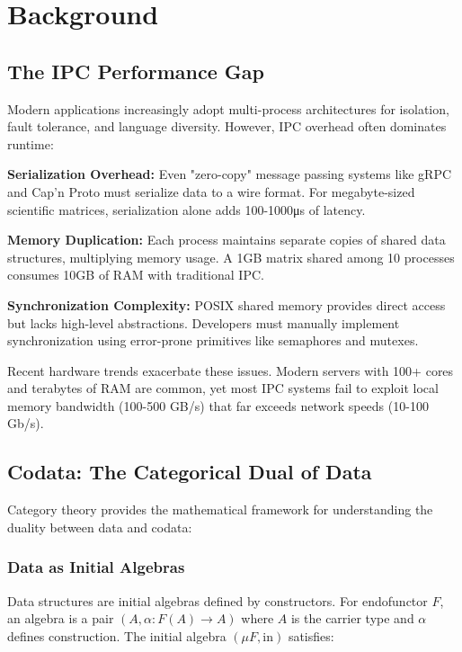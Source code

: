 \documentclass[11pt]{article}
\begin{document}
\section{Background}

\subsection{The IPC Performance Gap}

Modern applications increasingly adopt multi-process architectures for isolation, fault tolerance, and language diversity. However, IPC overhead often dominates runtime:

\textbf{Serialization Overhead:} Even "zero-copy" message passing systems like gRPC and Cap'n Proto must serialize data to a wire format. For megabyte-sized scientific matrices, serialization alone adds 100-1000μs of latency.

\textbf{Memory Duplication:} Each process maintains separate copies of shared data structures, multiplying memory usage. A 1GB matrix shared among 10 processes consumes 10GB of RAM with traditional IPC.

\textbf{Synchronization Complexity:} POSIX shared memory provides direct access but lacks high-level abstractions. Developers must manually implement synchronization using error-prone primitives like semaphores and mutexes.

Recent hardware trends exacerbate these issues. Modern servers with 100+ cores and terabytes of RAM are common, yet most IPC systems fail to exploit local memory bandwidth (100-500 GB/s) that far exceeds network speeds (10-100 Gb/s).

\subsection{Codata: The Categorical Dual of Data}

Category theory provides the mathematical framework for understanding the duality between data and codata:

\subsubsection{Data as Initial Algebras}

Data structures are initial algebras defined by constructors. For endofunctor $F$, an algebra is a pair $(A, \alpha: F(A) \to A)$ where $A$ is the carrier type and $\alpha$ defines construction. The initial algebra $(\mu F, \text{in})$ satisfies:
\end{document}
